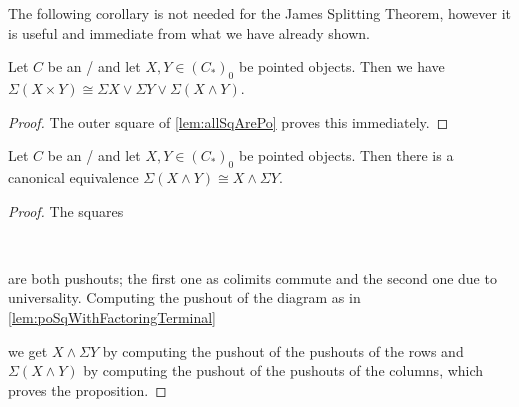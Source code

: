 The following corollary is not needed for the James Splitting Theorem, however it is useful and immediate from what we have already shown.
\begin{corollary}
    Let $C$ be an \inftytop/ and let $X,Y\in \left(C_*\right)_0$ be pointed objects. 
    Then we have $\Sigma\left(X\times Y\right)\cong\Sigma X\vee\Sigma Y\vee\Sigma\left(X\wedge Y\right)$.
    \begin{proof}
        The outer square of \cref{lem:allSqArePo} proves this immediately. 
    \end{proof}
\end{corollary}
\begin{lemma}\label{lem:suspensionCommutesWithSmash}
    Let $C$ be an \inftytop/ and let $X,Y\in \left(C_*\right)_0$ be pointed objects. 
    Then there is a canonical equivalence $\Sigma\left(X\wedge Y\right)\cong X\wedge\Sigma Y$.
    \begin{proof}
        The squares
        \begin{center}
            \
        \end{center}
        are both pushouts; the first one as colimits commute and the second one due to universality. %
        Computing the pushout of the diagram as in \cref{lem:poSqWithFactoringTerminal}
        \begin{center}
        \end{center}
        we get $X\wedge\Sigma Y$ by computing the pushout of the pushouts of the rows and $\Sigma\left(X\wedge Y\right)$ by computing the pushout of the pushouts of the columns, which proves the proposition.
    \end{proof}
\end{lemma}
